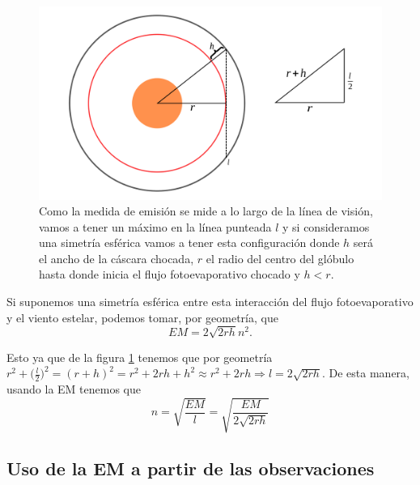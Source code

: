 \documentclass{book}
\begin{document}
\begin{figure}[h]
    \centering    \includegraphics[width=\textwidth]{artesanales/ImgFi01-4.pdf}
    \caption{Como la medida de emisión se mide a lo largo de la línea de visión, vamos a tener un máximo en la línea punteada $l$ y si consideramos una simetría esférica vamos a tener esta configuración donde $h$ será el ancho de la cáscara chocada, $r$ el radio del centro del glóbulo hasta donde inicia el flujo fotoevaporativo chocado y $h<r$.}
    \label{fig:EM}
\end{figure}

Si suponemos una simetría esférica entre esta interacción del flujo fotoevaporativo y el viento estelar, podemos tomar, por geometría, que
\[EM=2\sqrt{2rh}n^2.\]


Esto ya que de la figura \ref{fig:EM} tenemos que por geometría $r^2+\Big(\frac{l}{2}\Big)^2=(r+h)^2=r^2+2rh+h^2\approx r^2+2rh\Rightarrow l=2\sqrt{2rh}$. De esta manera, usando la EM tenemos que \[n=\sqrt{\frac{EM}{l}}=\sqrt{\frac{EM}{2\sqrt{2rh}}}\] 

\subsection{Uso de la EM a partir de las observaciones} \label{Subsec : EM}
\end{document}
